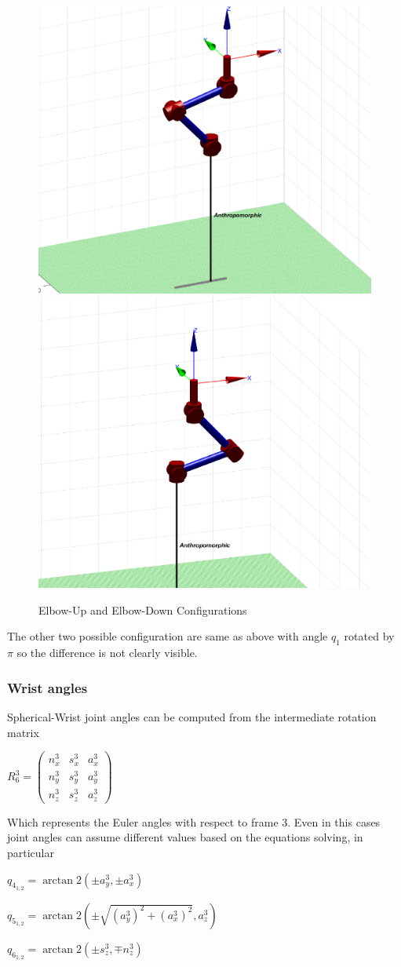 \begin{figure}[h]
\includegraphics[width=0.5\linewidth]{img/aarmeu}\quad\includegraphics[width=0.5\linewidth]{img/aarmed}
\caption{Elbow-Up and Elbow-Down Configurations}
\label{fig:aarmeud}
\end{figure}
The other two possible configuration are same as above with angle $q_1$ rotated by $\pi$ so the difference is not clearly visible.

\subsubsection{Wrist angles}
\label{ssec:wangles}
Spherical-Wrist joint angles can be computed from the intermediate rotation matrix 
\begin{center}
	$R^3_6 = \left(
	\begin{matrix}
		n^3_x & s^3_x & a^3_x \\
		n^3_y & s^3_y & a^3_y \\
		n^3_z & s^3_z & a^3_z		
	\end{matrix}
	\right)$	
\end{center}
Which represents the Euler angles with respect to frame 3. Even in this cases joint angles can assume different values based on the equations solving, in particular
\begin{center}
$q_{4_{1,2}} = \arctan2(\pm a^3_y, \pm a^3_x)$
\end{center}
\begin{center}
$q_{5_{1,2}} = \arctan2(\pm\sqrt{(a^3_y)^2+(a^3_x)^2}, a^3_z) $
\end{center}
\begin{center}
	$q_{6_{1,2}} = \arctan2(\pm s^3_z, \mp n^3_z)$
\end{center}

